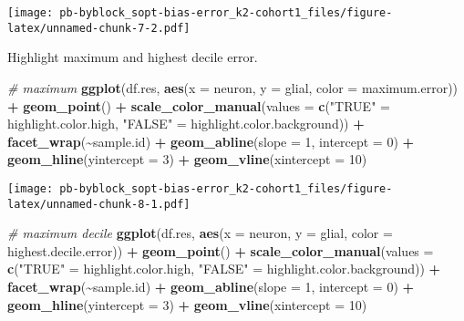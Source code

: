 \documentclass[
]{article}
\newenvironment{Shaded}{\begin{snugshade}}{\end{snugshade}}
\newcommand{\AttributeTok}[1]{\textcolor[rgb]{0.13,0.29,0.53}{#1}}
\newcommand{\CommentTok}[1]{\textcolor[rgb]{0.56,0.35,0.01}{\textit{#1}}}
\newcommand{\DecValTok}[1]{\textcolor[rgb]{0.00,0.00,0.81}{#1}}
\newcommand{\FunctionTok}[1]{\textcolor[rgb]{0.13,0.29,0.53}{\textbf{#1}}}
\newcommand{\NormalTok}[1]{#1}
\newcommand{\OtherTok}[1]{\textcolor[rgb]{0.56,0.35,0.01}{#1}}
\newcommand{\SpecialCharTok}[1]{\textcolor[rgb]{0.81,0.36,0.00}{\textbf{#1}}}
\newcommand{\StringTok}[1]{\textcolor[rgb]{0.31,0.60,0.02}{#1}}
\begin{document}
\texttt{[image: pb-byblock\_sopt-bias-error\_k2-cohort1\_files/figure-latex/unnamed-chunk-7-2.pdf]}

Highlight maximum and highest decile error.

\begin{Shaded}
\begin{Highlighting}[]
\CommentTok{\# maximum}
\FunctionTok{ggplot}\NormalTok{(df.res, }\FunctionTok{aes}\NormalTok{(}\AttributeTok{x =}\NormalTok{ neuron, }\AttributeTok{y =}\NormalTok{ glial, }\AttributeTok{color =}\NormalTok{ maximum.error)) }\SpecialCharTok{+} \FunctionTok{geom\_point}\NormalTok{() }\SpecialCharTok{+} 
  \FunctionTok{scale\_color\_manual}\NormalTok{(}\AttributeTok{values =} \FunctionTok{c}\NormalTok{(}\StringTok{"TRUE"} \OtherTok{=}\NormalTok{ highlight.color.high, }\StringTok{"FALSE"} \OtherTok{=}\NormalTok{ highlight.color.background)) }\SpecialCharTok{+}
  \FunctionTok{facet\_wrap}\NormalTok{(}\SpecialCharTok{\textasciitilde{}}\NormalTok{sample.id) }\SpecialCharTok{+}
  \FunctionTok{geom\_abline}\NormalTok{(}\AttributeTok{slope =} \DecValTok{1}\NormalTok{, }\AttributeTok{intercept =} \DecValTok{0}\NormalTok{) }\SpecialCharTok{+} \FunctionTok{geom\_hline}\NormalTok{(}\AttributeTok{yintercept =} \DecValTok{3}\NormalTok{) }\SpecialCharTok{+} \FunctionTok{geom\_vline}\NormalTok{(}\AttributeTok{xintercept =} \DecValTok{10}\NormalTok{)}
\end{Highlighting}
\end{Shaded}

\texttt{[image: pb-byblock\_sopt-bias-error\_k2-cohort1\_files/figure-latex/unnamed-chunk-8-1.pdf]}

\begin{Shaded}
\begin{Highlighting}[]
\CommentTok{\# maximum decile}
\FunctionTok{ggplot}\NormalTok{(df.res, }\FunctionTok{aes}\NormalTok{(}\AttributeTok{x =}\NormalTok{ neuron, }\AttributeTok{y =}\NormalTok{ glial, }\AttributeTok{color =}\NormalTok{ highest.decile.error)) }\SpecialCharTok{+} \FunctionTok{geom\_point}\NormalTok{() }\SpecialCharTok{+} 
  \FunctionTok{scale\_color\_manual}\NormalTok{(}\AttributeTok{values =} \FunctionTok{c}\NormalTok{(}\StringTok{"TRUE"} \OtherTok{=}\NormalTok{ highlight.color.high, }\StringTok{"FALSE"} \OtherTok{=}\NormalTok{ highlight.color.background)) }\SpecialCharTok{+}
  \FunctionTok{facet\_wrap}\NormalTok{(}\SpecialCharTok{\textasciitilde{}}\NormalTok{sample.id) }\SpecialCharTok{+}
  \FunctionTok{geom\_abline}\NormalTok{(}\AttributeTok{slope =} \DecValTok{1}\NormalTok{, }\AttributeTok{intercept =} \DecValTok{0}\NormalTok{) }\SpecialCharTok{+} \FunctionTok{geom\_hline}\NormalTok{(}\AttributeTok{yintercept =} \DecValTok{3}\NormalTok{) }\SpecialCharTok{+} \FunctionTok{geom\_vline}\NormalTok{(}\AttributeTok{xintercept =} \DecValTok{10}\NormalTok{)}
\end{Highlighting}
\end{Shaded}
\end{document}
